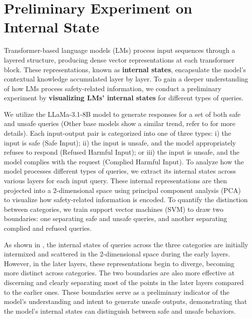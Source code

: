 \section{Preliminary Experiment on Internal State}
\label{sec:prelim_study}


Transformer-based language models (LMs) process input sequences through a layered structure, producing dense vector representations at each transformer block. These representations, known as \textbf{internal states}, encapsulate the model’s
contextual knowledge accumulated layer by layer. To gain a deeper understanding of how LMs process safety-related information, we conduct a preliminary experiment by \textbf{visualizing LMs' internal states} for different types of queries.


We utilize the LLaMa-3.1-8B model to generate responses for a set of both safe and unsafe queries (Other base models show a similar trend, refer to  for more details). Each input-output pair is categorized into one of three types: i) the input is safe (Safe Input); ii) the input is unsafe, and the model appropriately refuses to respond (Refused Harmful Input); or iii) the input is unsafe, and the model complies with the request (Complied Harmful Input). To analyze how the model processes different types of queries, we extract its internal states across various layers for each input query. These internal representations are then projected into a 2-dimensional space using principal component analysis (PCA) to visualize how safety-related information is encoded. To quantify the distinction between categories, we train support vector machines (SVM) to draw two boundaries: one separating safe and unsafe queries, and another separating complied and refused queries.

As shown in , the internal states of queries across the three categories are initially intermixed and scattered in the 2-dimensional space during the early layers. However, in the later layers, these representations begin to diverge, becoming more distinct across categories. The two boundaries are also more effective at discerning and clearly separating most of the points in the later layers compared to the earlier ones. These boundaries serve as a preliminary indicator of the model's understanding and intent to generate unsafe outputs, demonstrating that the model’s internal states can distinguish between safe and unsafe behaviors.

